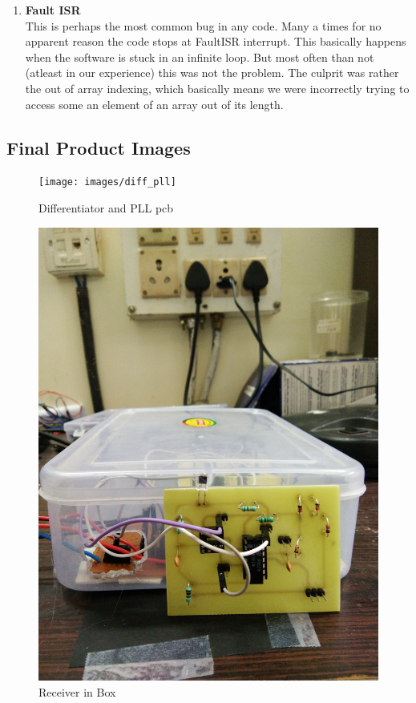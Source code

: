 \documentclass{article}
\begin{document}
\begin{enumerate}
\item \textbf{Fault ISR}\\
  This is perhaps the most common bug in any code. Many a times for no apparent reason the code stops at FaultISR interrupt. This basically happens when the software is stuck in an infinite loop. But most often than not (atleast in our experience) this was not the problem. The culprit was rather the out of array indexing, which basically means we were incorrectly trying to access some an element of an array out of its length. 
\end{enumerate}

\subsection{Final Product Images}
\begin{figure}[H]
  \centering
  \texttt{[image: images/diff\_pll]}
  \caption{Differentiator and PLL pcb}
  \label{fig:diff_pll}
\end{figure}

\begin{figure}[H]
  \centering
  \includegraphics[scale=0.05]{images/receiver_box}
  \caption{Receiver in Box}
  \label{fig:rx_box}
\end{figure}
\end{document}
